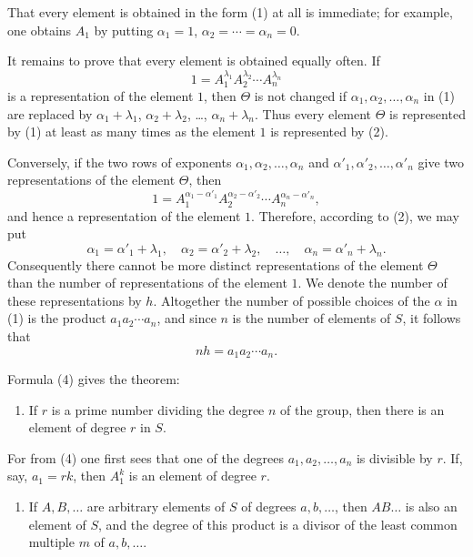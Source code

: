 \documentclass[11pt]{article}
\begin{document}
That every element is obtained in the form (1) at all is immediate; for example, one obtains $A_1$ by putting $\alpha_1=1$, $\alpha_2=\cdots=\alpha_n=0$.

It remains to prove that every element is obtained equally often. If
\begin{equation}
1=A_1^{\lambda_1}A_2^{\lambda_2}\cdots A_n^{\lambda_n}
\tag{2}
\end{equation}
is a representation of the element $1$, then $\Theta$ is not changed if $\alpha_1,\alpha_2,\ldots,\alpha_n$ in (1) are replaced by $\alpha_1+\lambda_1$, $\alpha_2+\lambda_2$, \ldots, $\alpha_n+\lambda_n$. Thus every element $\Theta$ is represented by (1) at least as many times as the element $1$ is represented by (2).

Conversely, if the two rows of exponents $\alpha_1,\alpha_2,\ldots,\alpha_n$ and $\alpha'_1,\alpha'_2,\ldots,\alpha'_n$ give two representations of the element $\Theta$, then
\begin{equation}
1=A_1^{\alpha_1-\alpha'_1}A_2^{\alpha_2-\alpha'_2}\cdots A_n^{\alpha_n-\alpha'_n},
\tag{3}
\end{equation}
and hence a representation of the element $1$. Therefore, according to (2), we may put
\[
\alpha_1=\alpha'_1+\lambda_1,
\quad \alpha_2=\alpha'_2+\lambda_2,
\quad \ldots,
\quad \alpha_n=\alpha'_n+\lambda_n.
\]
Consequently there cannot be more distinct representations of the element $\Theta$ than the number of representations of the element $1$. We denote the number of these representations by $h$. Altogether the number of possible choices of the $\alpha$ in (1) is the product $a_1a_2\cdots a_n$, and since $n$ is the number of elements of $S$, it follows that
\begin{equation}
nh=a_1a_2\cdots a_n.
\tag{4}
\end{equation}

Formula (4) gives the theorem:

\begin{enumerate}[resume,label=\arabic*.]
\item If $r$ is a prime number dividing the degree $n$ of the group, then there is an element of degree $r$ in $S$.
\end{enumerate}

For from (4) one first sees that one of the degrees $a_1,a_2,\ldots,a_n$ is divisible by $r$. If, say, $a_1=rk$, then $A_1^k$ is an element of degree $r$.

\begin{enumerate}[resume,label=\arabic*.]
\item If $A,B,\ldots$ are arbitrary elements of $S$ of degrees $a,b,\ldots$, then $AB\ldots$ is also an element of $S$, and the degree of this product is a divisor of the least common multiple $m$ of $a,b,\ldots$.
\end{enumerate}
\end{document}
